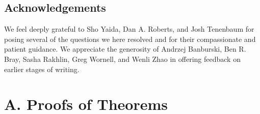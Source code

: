 \documentclass{article}
\begin{document}

\subsection{Acknowledgements}
    We feel deeply grateful to Sho Yaida, Dan A. Roberts, and Josh Tenenbaum
    for posing several of the questions we here resolved and for their
    compassionate and patient guidance.  We appreciate the generosity of
        Andrzej Banburski,
        Ben R. Bray,
        Sasha Rakhlin,
        Greg Wornell, and
        Wenli Zhao
    in offering feedback on earlier stages of writing.


    
    


\section*{A. Proofs of Theorems}
\end{document}
